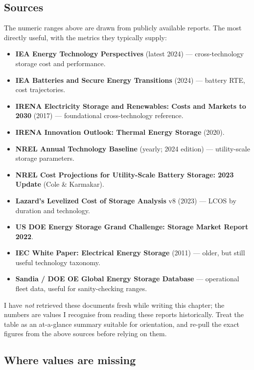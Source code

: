 \subsection*{Sources}

The numeric ranges above are drawn from publicly available reports.
The most directly useful, with the metrics they typically supply:

\begin{itemize}
    \item \textbf{IEA Energy Technology Perspectives} (latest 2024) ---
    cross-technology storage cost and performance.
    \item \textbf{IEA Batteries and Secure Energy Transitions} (2024)
    --- battery RTE, cost trajectories.
    \item \textbf{IRENA Electricity Storage and Renewables: Costs and
    Markets to 2030} (2017) --- foundational cross-technology
    reference.
    \item \textbf{IRENA Innovation Outlook: Thermal Energy Storage}
    (2020).
    \item \textbf{NREL Annual Technology Baseline} (yearly; 2024
    edition) --- utility-scale storage parameters.
    \item \textbf{NREL Cost Projections for Utility-Scale Battery
    Storage: 2023 Update} (Cole \& Karmakar).
    \item \textbf{Lazard's Levelized Cost of Storage Analysis} v8
    (2023) --- LCOS by duration and technology.
    \item \textbf{US DOE Energy Storage Grand Challenge: Storage Market
    Report 2022}.
    \item \textbf{IEC White Paper: Electrical Energy Storage} (2011) ---
    older, but still useful technology taxonomy.
    \item \textbf{Sandia / DOE OE Global Energy Storage Database} ---
    operational fleet data, useful for sanity-checking ranges.
\end{itemize}

I have \emph{not} retrieved these documents fresh while writing this
chapter; the numbers are values I recognise from reading these
reports historically. Treat the table as an at-a-glance summary
suitable for orientation, and re-pull the exact figures from the
above sources before relying on them.

\subsection*{Where values are missing}

